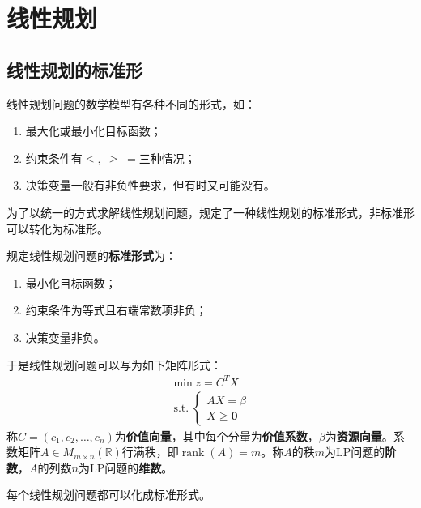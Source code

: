 \section{线性规划}

\subsection{线性规划的标准形}
线性规划问题的数学模型有各种不同的形式，如：
\begin{enumerate}
	\item 最大化或最小化目标函数；
	\item 约束条件有$\leqslant,\;\geqslant\;=$三种情况；
	\item 决策变量一般有非负性要求，但有时又可能没有。
\end{enumerate}
为了以统一的方式求解线性规划问题，规定了一种线性规划的标准形式，非标准形可以转化为标准形。
\begin{definition}
	规定线性规划问题的\textbf{标准形式}为：
	\begin{enumerate}
		\item 最小化目标函数；
		\item 约束条件为等式且右端常数项非负；
		\item 决策变量非负。
	\end{enumerate}
	于是线性规划问题可以写为如下矩阵形式：
	\begin{gather*}
		\min z=C^TX \\
		\operatorname{s.t.}
		\begin{cases}
			AX=\beta \\
			X\geqslant\mathbf{0}
		\end{cases}
	\end{gather*}
	称$C=(c_1,c_2,\dots,c_n)$为\textbf{价值向量}，其中每个分量为\textbf{价值系数}，$\beta$为\textbf{资源向量}。系数矩阵$A\in M_{m\times n}(\mathbb{R})$行满秩，即$\operatorname{rank}(A)=m$。称$A$的秩$m$为LP问题的\textbf{阶数}，$A$的列数$n$为LP问题的\textbf{维数}。
\end{definition}
\begin{theorem}
	每个线性规划问题都可以化成标准形式。
\end{theorem}
